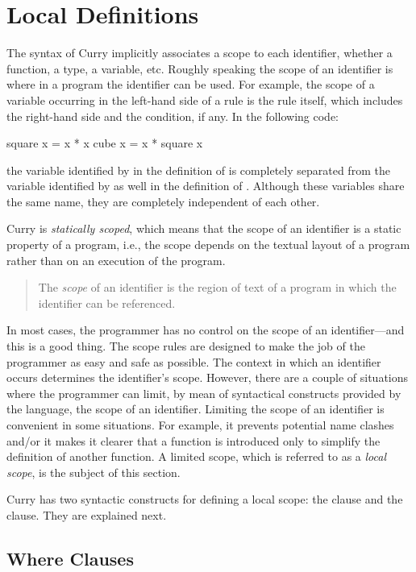 \section{Local Definitions}

The syntax of Curry implicitly associates a scope
to each identifier, whether a function, a type, a variable, etc.
Roughly speaking the scope of an identifier is where in a program
the identifier can be used.
For example, the scope of a variable occurring in the left-hand side
of a rule is the rule itself, which includes the right-hand side
and the condition, if any.
In the following code:
%
\begin{prog}
square x = x * x
cube   x = x * square x
\end{prog}
%
the variable identified by  in the definition of 
is completely separated from the variable 
identified by  as well in the definition of .
Although these variables share the same name, they
are completely independent of each other.

Curry is \emph{statically scoped},
which means that the scope of an
identifier is a static property of a program, i.e.,
the scope depends on the textual layout of a program rather than on
an execution of the program.
%
\begin{quote}
The \emph{scope} of an identifier is the region of text
of a program in which the identifier can be referenced.
\end{quote}
%
In most cases, the programmer has no control on the scope of
an identifier---and this is a good thing.
The scope rules are designed to make the job of the programmer
as easy and safe as possible.
The context in which an identifier occurs determines the
identifier's scope.
However, there are a couple of situations where the programmer
can limit, by mean of syntactical constructs provided by the language,
the scope of an identifier.
Limiting the scope of an identifier is convenient in some situations.
For example, it prevents potential name clashes
and/or it makes it clearer that a function is
introduced only to simplify the definition of another function.
A limited scope,
which is referred to as a \emph{local scope},
is the subject of this section.

Curry has two syntactic constructs 
for defining a local scope: the  clause
and the  clause.
They are explained next.

\subsection{{\selectfont Where} Clauses}
\label{where-clause}


